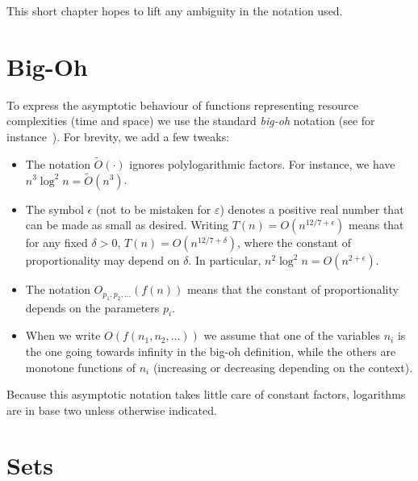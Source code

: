 
This short chapter hopes to lift any ambiguity in the notation used.

\section*{Big-Oh}

To express the asymptotic behaviour of functions representing resource
complexities (time and space) we use the standard \emph{big-oh} notation
(see for instance~\cite[Chapter~3]{CLRS09}). For brevity, we add a few
tweaks:

\begin{itemize}

\item The notation $\tilde{O}(\cdot)$ ignores polylogarithmic factors. For
	instance, we have
	\(n^3 \log^2 n = \tilde{O}(n^3)\).

\item The symbol $\epsilon$ (not to be mistaken for \(\varepsilon\))
	denotes a positive real number that can be made as small as desired.
	Writing \(T(n) = O(n^{12/7 + \epsilon})\) means that for any fixed
	\(\delta > 0\), \(T(n) = O(n^{12/7 + \delta})\), where the constant of
	proportionality may depend on \(\delta\).
	In particular, \(n^2 \log^2 n = O(n^{2 + \epsilon})\).

\item The notation \(O_{p_1,p_2, \ldots}(f(n))\) means that the constant of
	proportionality depends on the parameters \(p_i\).

\item When we write \(O(f(n_1,n_2, \ldots))\) we assume that one of the variables
	\(n_i\) is the one going towards infinity in the big-oh definition, while the
	others are monotone functions of \(n_i\) (increasing or decreasing
	depending on the context).

\end{itemize}

Because this asymptotic notation takes little care of constant factors,
logarithms are in base two unless otherwise indicated.

\section*{Sets}

